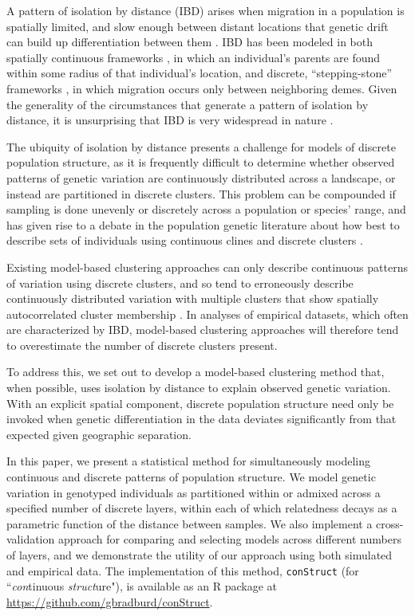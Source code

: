 \documentclass[12pt]{article}
\begin{document}
A pattern of isolation by distance (IBD) arises when migration in a
population is spatially limited, and slow enough between distant
locations that genetic drift can build up differentiation between them
\citep{Wright1943}. 
IBD has been modeled in both spatially continuous frameworks 
\citep{malecot1969mathematics,Slatkin1985}, 
in which an individual's parents are found within some radius of that individual's location,
and discrete, ``stepping-stone'' frameworks \citep{kimura1964stepping},
in which migration occurs only between neighboring demes.
Given the generality of the circumstances that generate a pattern of isolation by distance, 
it is unsurprising that IBD is very widespread in nature \citep{meirmans2012,Sexton_etal_2014}.

The ubiquity of isolation by distance presents a challenge for models of discrete population structure,
as it is frequently difficult to determine whether observed patterns of genetic variation are 
continuously distributed across a landscape, or instead are partitioned in discrete clusters.
This problem can be compounded if sampling is done unevenly or discretely across a population or species' range,
and has given rise to a debate in the population genetic literature
about how best to describe sets of individuals using continuous clines and discrete clusters 
\citep[e.g.][]{SerrePaabo2004,rosenberg2005clines}.

Existing model-based clustering approaches can only describe continuous patterns of variation using
discrete clusters, and so tend to erroneously describe continuously distributed variation with multiple clusters that 
show spatially autocorrelated cluster membership \citep{Frantz2009,meirmans2012}.
In analyses of empirical datasets, which often are characterized by IBD,
model-based clustering approaches will therefore tend to overestimate
the number of discrete clusters present. 

To address this, we set out to develop
a model-based clustering method that, when possible, uses isolation by distance 
to explain observed genetic variation.
With an explicit spatial component, discrete population structure need only be invoked when genetic differentiation 
in the data deviates significantly from that expected given geographic separation.

In this paper, we present a statistical method for simultaneously 
modeling continuous and discrete patterns of population structure.
We model genetic variation in genotyped individuals as 
partitioned within or admixed across a specified number of discrete layers,
within each of which relatedness decays as a parametric function of the distance between samples.
We also implement a cross-validation approach for comparing and selecting models across different numbers of layers,
and we demonstrate the utility of our approach using both simulated and empirical data.
The implementation of this method, \texttt{conStruct} (for ``\emph{con}tinuous \emph{struct}ure"), 
is available as an R package at 
\href{https://github.com/gbradburd/conStruct}{https://github.com/gbradburd/conStruct}.
\end{document}
